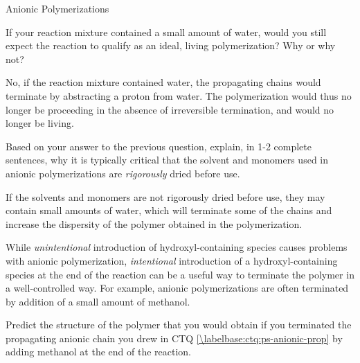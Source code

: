 \begin{activity}{Anionic Polymerizations}
\begin{ctqs}
	\question If your reaction mixture contained a small amount of water, would you still expect the reaction to qualify as an ideal, living polymerization?  Why or why not?
	
		\begin{solution}[1.25in]
			No, if the reaction mixture contained water, the propagating chains would terminate by abstracting a proton from water.  The polymerization would thus no longer be proceeding in the absence of irreversible termination, and would no longer be living.
		\end{solution}
	
	\question Based on your answer to the previous question, explain, in 1-2 complete sentences, why it is typically critical that the solvent and monomers used in anionic polymerizations are \emph{rigorously} dried before use.
	
		\begin{solution}[1.25in]
			If the solvents and monomers are not rigorously dried before use, they may contain small amounts of water, which will terminate some of the chains and increase the dispersity of the polymer obtained in the polymerization.
		\end{solution}
	
\end{ctqs}

\begin{infobox}

	While \emph{unintentional} introduction of hydroxyl-containing species causes problems with anionic polymerization, \emph{intentional} introduction of a hydroxyl-containing species at the end of the reaction can be a useful way to terminate the polymer in a well-controlled way.  For example, anionic polymerizations are often terminated by addition of a small amount of methanol.

\end{infobox}

\begin{ctqs}

	\question Predict the structure of the polymer that you would obtain if you terminated the propagating anionic chain you drew in CTQ \ref{\labelbase:ctq:ps-anionic-prop} by adding methanol at the end of the reaction.
	
		\begin{solution}[2in]
		\studentdisplay{}
		\end{solution}


\end{ctqs}
\end{activity}
